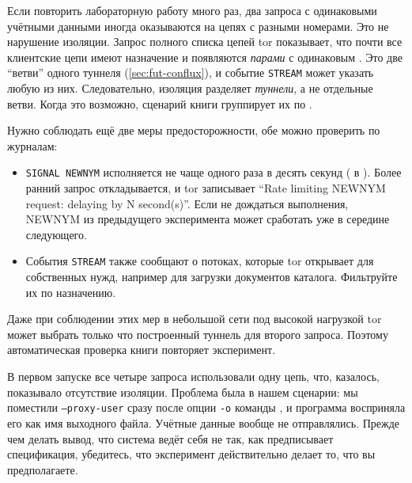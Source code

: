 \begin{approfondimento}
Если повторить лабораторную работу много раз, два запроса с одинаковыми учётными данными иногда оказываются на цепях с разными номерами. Это не нарушение изоляции. Запрос полного списка цепей tor показывает, что почти все клиентские цепи имеют назначение  и появляются \emph{парами} с одинаковым . Это две \enquote{ветви} одного туннеля (\cref{sec:fut-conflux}), и событие \texttt{STREAM} может указать любую из них. Следовательно, изоляция разделяет \emph{туннели}, а не отдельные ветви. Когда это возможно, сценарий книги группирует их по .

Нужно соблюдать ещё две меры предосторожности, обе можно проверить по журналам:
\begin{itemize}
  \item \texttt{SIGNAL NEWNYM} исполняется не чаще одного раза в десять секунд ( в ). Более ранний запрос откладывается, и tor записывает \enquote{Rate limiting NEWNYM request: delaying by N second(s)}. Если не дождаться выполнения, NEWNYM из предыдущего эксперимента может сработать уже в середине следующего.
  \item События \texttt{STREAM} также сообщают о потоках, которые tor открывает для собственных нужд, например для загрузки документов каталога. Фильтруйте их по назначению.
\end{itemize}
Даже при соблюдении этих мер в небольшой сети под высокой нагрузкой tor может выбрать только что построенный туннель для второго запроса. Поэтому автоматическая проверка книги повторяет эксперимент.
\end{approfondimento}

\begin{attenzione}
В первом запуске все четыре запроса использовали одну цепь, что, казалось, показывало отсутствие изоляции. Проблема была в нашем сценарии: мы поместили \texttt{--proxy-user} сразу после опции \texttt{-o} команды , и программа восприняла его как имя выходного файла. Учётные данные вообще не отправлялись. Прежде чем делать вывод, что система ведёт себя не так, как предписывает спецификация, убедитесь, что эксперимент действительно делает то, что вы предполагаете.
\end{attenzione}

